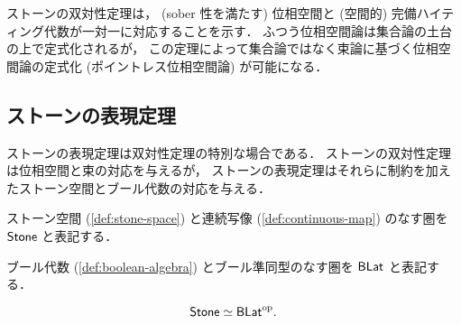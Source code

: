 \documentclass[titlepage]{ltjsreport}
\begin{document}
ストーンの双対性定理は，
(sober 性を満たす)
位相空間と
(空間的)
完備ハイティング代数が一対一に対応することを示す．
ふつう位相空間論は集合論の土台の上で定式化されるが，
この定理によって集合論ではなく束論に基づく位相空間論の定式化
(ポイントレス位相空間論)
が可能になる．

\subsection{ストーンの表現定理}

ストーンの表現定理は双対性定理の特別な場合である．
ストーンの双対性定理は位相空間と束の対応を与えるが，
ストーンの表現定理はそれらに制約を加えたストーン空間とブール代数の対応を与える．

\begin{definition}[ストーン空間の圏]
  ストーン空間
  (\cref{def:stone-space})
  と連続写像
  (\cref{def:continuous-map})
  のなす圏を $\mathsf{Stone}$ と表記する．
\end{definition}

\begin{definition}[ブール代数の圏]
  ブール代数 (\cref{def:boolean-algebra})
  とブール準同型のなす圏を $\mathsf{BLat}$ と表記する．
\end{definition}

\newcommand{\spec}{\operatorname{spec}}
\newcommand{\clop}{\operatorname{clop}}

\begin{theorem}[ストーンの表現定理]
  \begin{equation}
    \mathsf{Stone}\simeq\mathsf{BLat}^\mathrm{op}.
  \end{equation}
\end{theorem}
\end{document}
